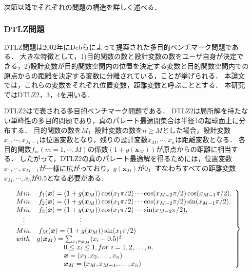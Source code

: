 \documentclass[../main/main]{subfiles}
\begin{document}
次節以降でそれぞれの問題の構造を詳しく述べる．

\subsubsection{DTLZ問題}
DTLZ問題\cite{Deb2002Scalable}は2002年にDebらによって提案された多目的ベンチマーク問題である．
大きな特徴として，1)目的関数の数と設計変数の数をユーザ自身が決定できる，2)設計変数が目的関数空間内の位置を決定する変数と目的関数空間内での原点からの距離を決定する変数に分離されている，ことが挙げられる．
本論文では，これらの変数をそれぞれ位置変数，距離変数と呼ぶこととする．
本研究ではDTLZ2，3，4を用いる．

DTLZ2はで表される多目的ベンチマーク問題である．
DTLZ2は局所解を持たない単峰性の多目的問題であり，真のパレート最適開集合は半径1の超球面上に分布する．
目的関数の数を$M$，設計変数の数を$n \geq M$とした場合，設計変数$x_1,\cdots,x_{M-1}$は位置変数となり，残りの設計変数$x_M,\cdots,x_n$は距離変数となる．
各目的関数$f_m(m=1, \cdots ,M)$の係数$(1+g(\bm{x}_M))$が原点からの距離に相当する．
したがって，DTLZ2の真のパレート最適解を得るためには，位置変数$x_1,\cdots,x_{M-1}$が一様に広がっており，$g(\bm{x}_M)$が$0$，すなわちすべての距離変数$x_M,\cdots,x_n$が$0.5$となる必要がある．

\begin{eqnarray} 
\left.
\begin{array}{ll}
Min. \quad f_{1} (\bm{x}) = (1+g(\bm{x}_{M}))\cos(x_{1}\pi/2)  \cdots  \cos(x_{M-2}\pi/2)\cos(x_{M-1}\pi/2),\\
Min. \quad f_{2} (\bm{x}) = (1+g(\bm{x}_{M}))\cos(x_{1}\pi/2)  \cdots  \cos(x_{M-2}\pi/2)\sin(x_{M-1}\pi/2), \\
Min. \quad f_{3} (\bm{x}) = (1+g(\bm{x}_{M}))\cos(x_{1}\pi/2)  \cdots  \sin(x_{M-2}\pi/2), \\
     \  \  \ $\vdots$    \qquad     \qquad      \qquad     \qquad \vdots \\
Min. \quad f_{M}(\bm{x}) = (1+g(\bm{x}_{M}))\sin(x_{1}\pi/2)\\
with \quad g(\bm{x}_{M}) = \sum_{x_i \in \bm{x}_M} (x_i - 0.5)^2  \\
   \qquad    \qquad    \qquad  \quad      0 \le x_{i} \le 1,  for \ i = 1, 2, \ldots, n. \\
   \qquad    \qquad    \qquad  \quad        \bm x = (x_1,x_2, \ldots, x_n)\\
   \qquad    \qquad    \qquad  \quad        \bm{x}_M = (x_M,x_{M+1}, \ldots, x_n)
   \label{dtlz2} 
\end{array}
\right\}
\end{eqnarray}
\end{document}
